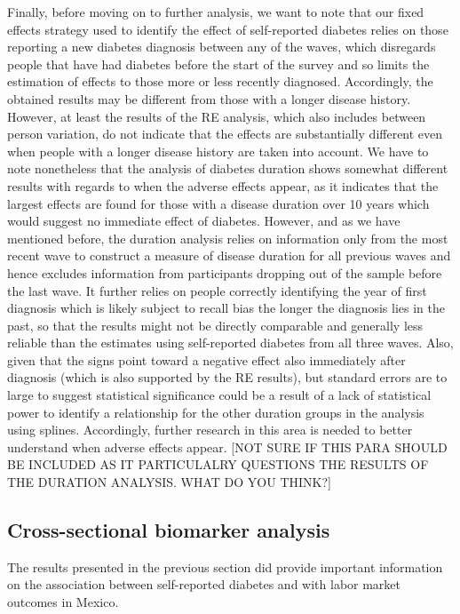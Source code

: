 \documentclass[12pt,english,british]{article}
\begin{document}
Finally, before moving on to further analysis, we want to note that our fixed effects strategy used to identify the effect of self-reported diabetes relies on those reporting a new diabetes diagnosis between any of the waves, which disregards people that have had diabetes before the start of the survey and so limits the estimation of effects to those more or less recently diagnosed. Accordingly, the obtained results may be different from those with a longer disease history. However, at least the results of the \ac{RE} analysis, which also includes between person variation, do not indicate that the effects are substantially different even when people with a longer disease history are taken into account. We have to note nonetheless that the analysis of diabetes duration shows somewhat different results with regards to when the adverse effects appear, as it indicates that the largest effects are found for those with a disease duration over 10 years which would suggest no immediate effect of diabetes. However, and as we have mentioned before, the duration analysis relies on information only from the most recent wave to construct a measure of disease duration for all previous waves and hence excludes information from participants dropping out of the sample before the last wave. It further relies on people correctly identifying the year of first diagnosis which is likely subject to recall bias the longer the diagnosis lies in the past, so that the results might not be directly comparable and generally less reliable than the estimates using self-reported diabetes from all three waves. Also, given that the signs point toward a negative effect also immediately after diagnosis (which is also supported by the \ac{RE} results), but standard errors are to large to suggest statistical significance could be a result of a lack of statistical power to identify a relationship for the other duration groups in the analysis using splines. Accordingly, further research in this area is needed to better understand when adverse effects appear. [NOT SURE IF THIS PARA SHOULD BE INCLUDED AS IT PARTICULALRY QUESTIONS THE RESULTS OF THE DURATION ANALYSIS. WHAT DO YOU THINK?]
  

\subsection{Cross-sectional biomarker analysis}

The results presented in the previous section did provide important
information on the association between self-reported diabetes and
with labor market outcomes in Mexico.
\end{document}
